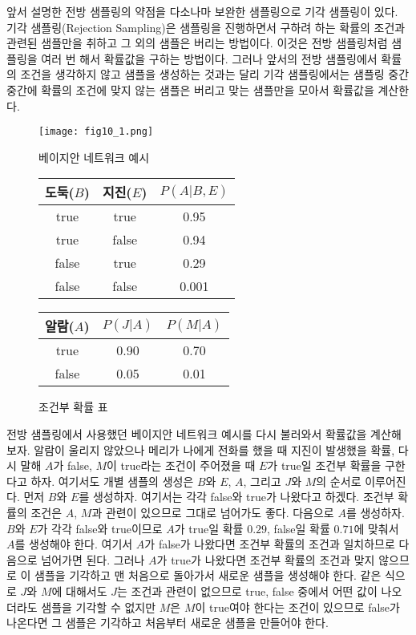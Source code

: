 \documentclass[a4paper]{oblivoir}
\begin{document}
앞서 설명한 전방 샘플링의 약점을 다소나마 보완한 샘플링으로 기각 샘플링이 있다. 기각 샘플링(Rejection Sampling)은 샘플링을 진행하면서 구하려 하는 확률의 조건과 관련된 샘플만을 취하고 그 외의 샘플은 버리는 방법이다. 이것은 전방 샘플링처럼 샘플링을 여러 번 해서 확률값을 구하는 방법이다. 그러나 앞서의 전방 샘플링에서 확률의 조건을 생각하지 않고 샘플을 생성하는 것과는 달리 기각 샘플링에서는 샘플링 중간중간에 확률의 조건에 맞지 않는 샘플은 버리고 맞는 샘플만을 모아서 확률값을 계산한다. \\

\begin{figure}[ht] \centering 
\texttt{[image: fig10\_1.png]} 
\caption{베이지안 네트워크 예시}
\label{fig:10-1-2}
\end{figure} 

\begin{figure}[ht] \centering 
\parbox[t]{3cm}
{
\begin{tabular}{|c|c|c|}
  \hline
  도둑($B$) & 지진($E$) & $P(A|B,E)$ \\
  \hline
  true & true & 0.95 \\
  \hline
  true & false & 0.94 \\
  \hline
  false & true & 0.29 \\
  \hline
  false & false & 0.001 \\
  \hline
\end{tabular}
} \hspace{3cm}
\parbox[t]{5cm}
{
\begin{tabular}{|c|c|c|}
  \hline
  알람($A$) & $P(J|A)$ & $P(M|A)$ \\
  \hline
  true & 0.90 & 0.70 \\
  \hline
  false & 0.05 & 0.01 \\
  \hline
\end{tabular}
}
\caption{조건부 확률 표}
\label{fig:10-1-1-2}
\end{figure} 

전방 샘플링에서 사용했던 베이지안 네트워크 예시를 다시 불러와서 확률값을 계산해보자. 알람이 울리지 않았으나 메리가 나에게 전화를 했을 때 지진이 발생했을 확률, 다시 말해 $A$가 false, $M$이 true라는 조건이 주어졌을 때 $E$가 true일 조건부 확률을 구한다고 하자. 여기서도 개별 샘플의 생성은 $B$와 $E$, $A$, 그리고 $J$와 $M$의 순서로 이루어진다. 먼저 $B$와 $E$를 생성하자. 여기서는 각각 false와 true가 나왔다고 하겠다. 조건부 확률의 조건은 $A$, $M$과 관련이 있으므로 그대로 넘어가도 좋다. 다음으로 $A$를 생성하자. $B$와 $E$가 각각 false와 true이므로 $A$가 true일 확률 $0.29$, false일 확률 $0.71$에 맞춰서 $A$를 생성해야 한다. 여기서 $A$가 false가 나왔다면 조건부 확률의 조건과 일치하므로 다음으로 넘어가면 된다. 그러나 $A$가 true가 나왔다면 조건부 확률의 조건과 맞지 않으므로 이 샘플을 기각하고 맨 처음으로 돌아가서 새로운 샘플을 생성해야 한다. 같은 식으로 $J$와 $M$에 대해서도 $J$는 조건과 관련이 없으므로 true, false 중에서 어떤 값이 나오더라도 샘플을 기각할 수 없지만 $M$은 $M$이 true여야 한다는 조건이 있으므로 false가 나온다면 그 샘플은 기각하고 처음부터 새로운 샘플을 만들어야 한다. \\
\end{document}
